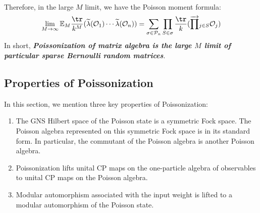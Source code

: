 \documentclass[a4paper,11pt]{article}
\theoremstyle{definition}
\numberwithin{equation}{section}
\begin{document}
Therefore, in the large $M$ limit, we have the Poisson moment formula:
\begin{equation}
    \lim_{M\rightarrow\infty}\mathbb{E}_M\frac{\tr}{k^M}(\widetilde{\lambda}(\mathcal{O}_1)\cdots\widetilde{\lambda}(\mathcal{O}_n)) = \sum_{\sigma\in\mathcal{P}_n}\prod_{S\in\sigma}\frac{\tr}{k}(\overrightarrow{\prod}_{j\in S}\mathcal{O}_j)
\end{equation}
In short, \textbf{\textit{Poissonization of matrix algebra is the large $M$ limit of particular sparse Bernoulli random matrices}}. 

\subsection{Properties of Poissonization}

In this section, we mention three key properties of Poissonization:
\begin{enumerate}
    \item The GNS Hilbert space of the Poisson state is a symmetric Fock space. The Poisson algebra represented on this symmetric Fock space is in its standard form. In particular, the commutant of the Poisson algebra is another Poisson algebra.
    \item Poissonization lifts unital CP maps on the one-particle algebra of observables to unital CP maps on the Poisson algebra.
    \item Modular automorphism associated with the input weight is lifted to a modular automorphism of the Poisson state.
\end{enumerate}
\end{document}
